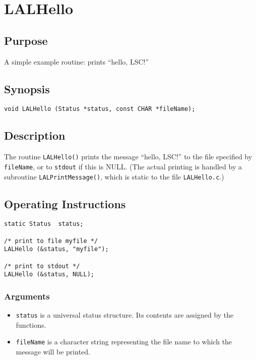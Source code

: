 \documentclass{article}
\begin{document}
\section{LALHello}

\subsection{Purpose}

A simple example routine: prints ``hello, LSC!''

\subsection{Synopsis}

\begin{verbatim}
void LALHello (Status *status, const CHAR *fileName);
\end{verbatim}

\subsection{Description}

The routine \texttt{LALHello()} prints the message ``hello, LSC!'' to the file
specified by \texttt{fileName}, or to \texttt{stdout} if this is NULL.  (The
actual printing is handled by a subroutine \texttt{LALPrintMessage()}, which
is static to the file \texttt{LALHello.c}.)

\subsection{Operating Instructions}

\begin{verbatim}
static Status  status;

/* print to file myfile */
LALHello (&status, "myfile");

/* print to stdout */
LALHello (&status, NULL);
\end{verbatim}


\subsubsection{Arguments}

\begin{itemize}
\item \texttt{status} is a universal status structure.  Its contents are
assigned by the functions.
\item \texttt{fileName} is a character string representing the file name to
which the message will be printed.
\end{itemize}
\end{document}
